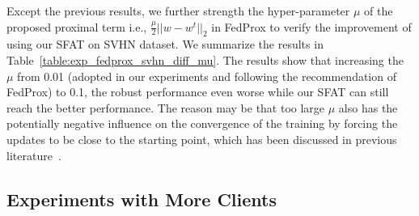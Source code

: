 \documentclass{article} %
\theoremstyle{plain}
\theoremstyle{definition}
\theoremstyle{remark}
\begin{document}
Except the previous results, we further strength the hyper-parameter $\mu$ of the proposed proximal term i.e., $\frac{\mu}{2}||w-w^t||_{2}$ in FedProx to verify the improvement of using our SFAT on SVHN dataset. We summarize the results in Table~\ref{table:exp_fedprox_svhn_diff_mu}. The results show that increasing the $\mu$ from 0.01 (adopted in our experiments and following the recommendation of FedProx) to 0.1, the robust performance even worse while our SFAT can still reach the better performance. The reason may be that too large $\mu$ also has the potentially negative influence on the convergence of the training by forcing the updates to be close to the starting point, which has been discussed in previous literature~\citep{karimireddy2020scaffold}.


\subsection{Experiments with More Clients}
\label{app:more_clients}
\end{document}
